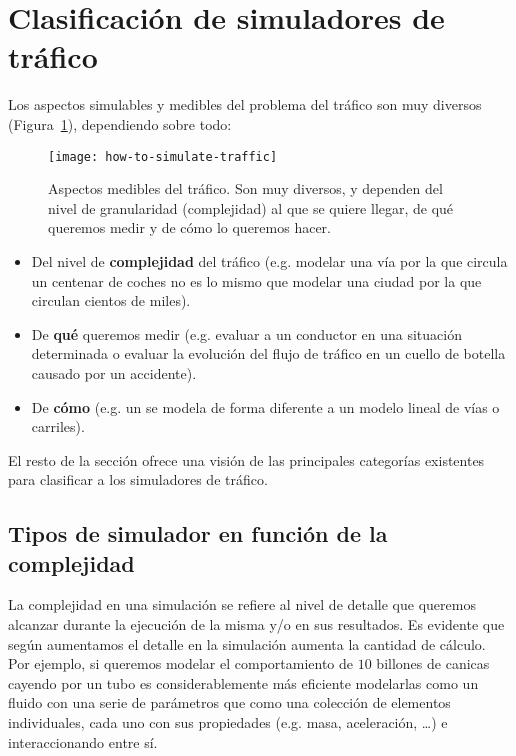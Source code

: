 \section{Clasificación de simuladores de tráfico}

Los aspectos simulables y medibles del problema del tráfico son muy diversos (Figura~\ref{fig:how-to-simulate-traffic}), dependiendo sobre todo:

\begin{figure}
	\centering
	\texttt{[image: how-to-simulate-traffic]}
	\caption[Aspectos medibles del tráfico]{Aspectos medibles del tráfico. Son muy diversos, y dependen del nivel de granularidad (complejidad) al que se quiere llegar, de qué queremos medir y de cómo lo queremos hacer.}
	\label{fig:how-to-simulate-traffic}
\end{figure}

\begin{itemize}
	\item Del nivel de \textbf{complejidad} del tráfico (e.g. modelar una vía por la que circula un centenar de coches no es lo mismo que modelar una ciudad por la que circulan cientos de miles).
	\item De \textbf{qué} queremos medir (e.g. evaluar a un conductor en una situación determinada o evaluar la evolución del flujo de tráfico en un cuello de botella causado por un accidente).
	\item De \textbf{cómo} (e.g. un  se modela de forma diferente a un modelo lineal de vías o carriles).
\end{itemize}

El resto de la sección ofrece una visión de las principales categorías existentes para clasificar a los simuladores de tráfico.

\subsection{Tipos de simulador en función de la complejidad}

La complejidad en una simulación se refiere al nivel de detalle que queremos alcanzar durante la ejecución de la misma y/o en sus resultados. Es evidente que según aumentamos el detalle en la simulación aumenta la cantidad de cálculo. Por ejemplo, si queremos modelar el comportamiento de $10$ billones de canicas cayendo por un tubo es considerablemente más eficiente modelarlas como un fluido con una serie de parámetros que como una colección de elementos individuales, cada uno con sus propiedades (e.g. masa, aceleración, \ldots) e interaccionando entre sí.

